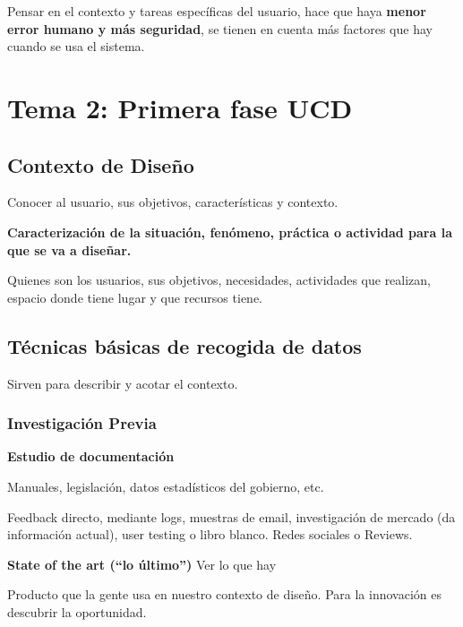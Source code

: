 Pensar en el contexto y tareas específicas del usuario, hace que haya
\textbf{menor error humano y más seguridad}, se tienen en cuenta más
factores que hay cuando se usa el sistema.

\hypertarget{tema-2-primera-fase-ucd}{%
\section{Tema 2: Primera fase UCD}\label{tema-2-primera-fase-ucd}}

\hypertarget{contexto-de-diseuxf1o}{%
\subsection{Contexto de Diseño}\label{contexto-de-diseuxf1o}}

Conocer al usuario, sus objetivos, características y contexto.

\textbf{Caracterización de la situación, fenómeno, práctica o actividad
para la que se va a diseñar.}

Quienes son los usuarios, sus objetivos, necesidades, actividades que
realizan, espacio donde tiene lugar y que recursos tiene.

\hypertarget{tuxe9cnicas-buxe1sicas-de-recogida-de-datos}{%
\subsection{Técnicas básicas de recogida de
datos}\label{tuxe9cnicas-buxe1sicas-de-recogida-de-datos}}

Sirven para describir y acotar el contexto.

\hypertarget{investigaciuxf3n-previa}{%
\subsubsection{Investigación Previa}\label{investigaciuxf3n-previa}}

\textbf{Estudio de documentación}

Manuales, legislación, datos estadísticos del gobierno, etc.

Feedback directo, mediante logs, muestras de email, investigación de
mercado (da información actual), user testing o libro blanco. Redes
sociales o Reviews.

\textbf{State of the art (``lo último'')} Ver lo que hay

Producto que la gente usa en nuestro contexto de diseño. Para la
innovación es descubrir la oportunidad.

